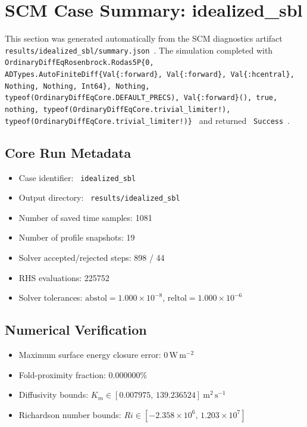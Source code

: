 \section{SCM Case Summary: idealized\_sbl}
\label{sec:scm_case_idealized_sbl}

This section was generated automatically from the SCM diagnostics artifact
\texttt{ results/idealized\_sbl/summary.json }. The simulation completed with \texttt{ OrdinaryDiffEqRosenbrock.Rodas5P\{0, ADTypes.AutoFiniteDiff\{Val\{:forward\}, Val\{:forward\}, Val\{:hcentral\}, Nothing, Nothing, Int64\}, Nothing, typeof(OrdinaryDiffEqCore.DEFAULT\_PRECS), Val\{:forward\}(), true, nothing, typeof(OrdinaryDiffEqCore.trivial\_limiter!), typeof(OrdinaryDiffEqCore.trivial\_limiter!)\} }
and returned \texttt{ Success }.

\subsection{Core Run Metadata}
\begin{itemize}
  \item Case identifier: \texttt{ idealized\_sbl }
  \item Output directory: \texttt{ results/idealized\_sbl }
  \item Number of saved time samples: 1081
  \item Number of profile snapshots: 19
  \item Solver accepted/rejected steps: 898 / 44
  \item RHS evaluations: 225752
  \item Solver tolerances: $\mathrm{abstol}=1.000 \times 10^{-8}$, $\mathrm{reltol}=1.000 \times 10^{-6}$
\end{itemize}

\subsection{Numerical Verification}
\begin{itemize}
  \item Maximum surface energy closure error:
  $0\,\mathrm{W\,m^{-2}}$
  \item Fold-proximity fraction:
  $0.000000\%$
  \item Diffusivity bounds:
  $K_m \in [0.007975,\,139.236524]~\mathrm{m^2\,s^{-1}}$
  \item Richardson number bounds:
  $Ri \in [-2.358 \times 10^{6},\,1.203 \times 10^{7}]$
\end{itemize}

